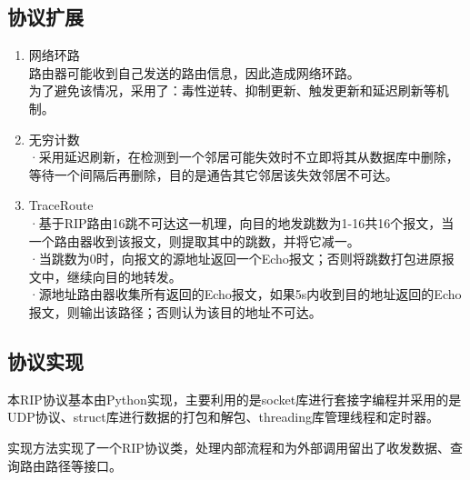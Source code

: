 	\subsection{协议扩展} %
	\label{sub:协议扩展}
		\begin{enumerate}
			\item 网络环路\\
				路由器可能收到自己发送的路由信息，因此造成网络环路。\\
				为了避免该情况，采用了：毒性逆转、抑制更新、触发更新和延迟刷新等机制。
			\item 无穷计数\\
				·采用延迟刷新，在检测到一个邻居可能失效时不立即将其从数据库中删除，等待一个间隔后再删除，目的是通告其它邻居该失效邻居不可达。
			\item TraceRoute\\
				·基于RIP路由16跳不可达这一机理，向目的地发跳数为1-16共16个报文，当一个路由器收到该报文，则提取其中的跳数，并将它减一。\\
				·当跳数为0时，向报文的源地址返回一个Echo报文；否则将跳数打包进原报文中，继续向目的地转发。\\
				·源地址路由器收集所有返回的Echo报文，如果5s内收到目的地址返回的Echo报文，则输出该路径；否则认为该目的地址不可达。
		\end{enumerate}
	\subsection{协议实现} %
	\label{sub:协议实现}
		本RIP协议基本由Python实现，主要利用的是socket库进行套接字编程并采用的是UDP协议、struct库进行数据的打包和解包、threading库管理线程和定时器。
		\par 实现方法实现了一个RIP协议类，处理内部流程和为外部调用留出了收发数据、查询路由路径等接口。
